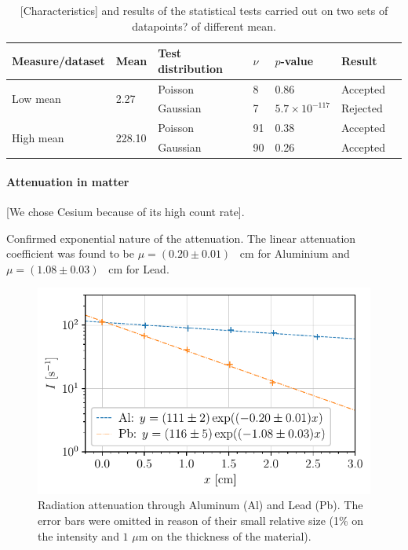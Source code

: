 \begin{table}[htbp]
    \centering
    \begin{tabular}{lllllll}
        \hline
        Measure/dataset & Mean & Test distribution & $\nu$ & $p$-value & Result \\
        \hline
        \multirow{2}{*}{Low mean} & \multirow{2}{*}{2.27} & Poisson & 8 & 0.86 & Accepted\\
        & & Gaussian & 7 & $5.7 \times 10^{-117}$ & Rejected \\
        \multirow{2}{*}{High mean} & \multirow{2}{*}{228.10} & Poisson & 91 & 0.38 & Accepted\\
        & & Gaussian & 90 & 0.26 & Accepted\\
        \hline
    \end{tabular}
    \caption{[Characteristics] and results of the statistical tests carried out on two sets of datapoints? of different mean.}
    \label{tab:statistical_tests}
\end{table}

\paragraph{Attenuation in matter}
[We chose Cesium because of its high count rate].

Confirmed exponential nature of the attenuation.
The linear attenuation coefficient was found to be $\mu = (0.20 \pm 0.01)$ \unit{\per\cm} for Aluminium
and $\mu = (1.08 \pm 0.03)$ \unit{\per\cm} for Lead.
\begin{figure}[htbp]
    \centering
    \includegraphics[scale=1]{figures/attenuation_coefficient.pdf}
    \caption{Radiation attenuation through Aluminum (Al) and Lead (Pb). 
             The error bars were omitted in reason of their small relative size 
             (1\% on the intensity and $1$ $\mu$m on the thickness of the material).}
    \label{fig:attenuation_coefficient}
\end{figure}


